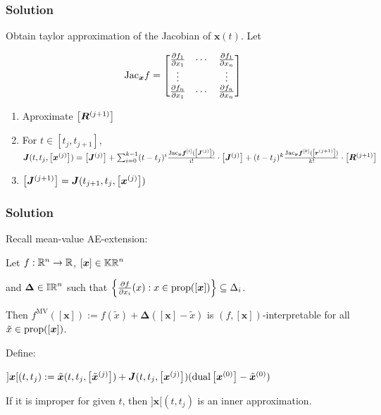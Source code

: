 \documentclass{beamer}
\newcommand{\fMV}{f^{\text{MV}}}
\begin{document}
\newcommand{\Jac}{\text{Jac}_{\bm{x}}}
\newcommand{\Enclosure}[1]{\arr{\bm{R}^{(#1)}}}
\newcommand{\Intervalbox}[1]{\arr{\bm{J}^{(#1)}}}

\begin{frame}
    \frametitle{Solution}

    Obtain taylor approximation of the Jacobian of $\bm{x}(t)$. Let \par
    \[\Jac f = \bmat
    \frac{\partial f_1}{\partial x_1} & \cdots & \frac{\partial f_1}{\partial x_n} \\
    \vdots & & \vdots \\
    \frac{\partial f_n}{\partial x_1} & \cdots & \frac{\partial f_n}{\partial x_n}
    \emat\]

    \vspace{7mm}
    \begin{enumerate}
        \item Aproximate $\Enclosure{j+1}$

        \vspace{2mm}
    \item For $t \in [t_j, t_{j+1}]$, $\bm{J}(t, t_j, \intervalbox{j}) = \Intervalbox{j} + \sum^{k-1}_{i=0} (t - t_j)^i \frac{\Jac\autof{i}(\Intervalbox{j})}{i!} \cdot \Intervalbox{j} + (t - t_j)^k \frac{\Jac\autof{k}(\enclosure{j+1})}{k!} \cdot \Enclosure{j+1}$

        \vspace{2mm}
        \item $\Intervalbox{j+1} = \bm{J}(t_{j+1}, t_j, \intervalbox{j})$
    \end{enumerate}
    
\end{frame}

\begin{frame}
    \frametitle{Solution}
    
    Recall mean-value AE-extension: \par
    Let $f: \mathbb R^n \rightarrow \mathbb R$, $[\bm{x}] \in \mathbb{KR}^n$ \par
    and $\bm{\Delta} \in \mathbb{IR}^n$ such that $\left\{\frac{\partial f}{\partial x_i}(x) : x \in \text{prop}([\bm{x}])\right\} \subseteq \Delta_i$. \par
    Then $\fMV([\bm{x}]) := f(\tilde{x}) + \bm{\Delta}([\bm{x}] - \tilde{x})$ is $(f, [\bm{x}])$-interpretable for all $\tilde{x} \in \text{prop}([\bm{x}])$.
 
    \vspace{7mm}
    Define: \par
    $]\bm{x}[(t, t_j) := \tilde{\bm{x}}(t, t_j, \left[\tilde{\bm{x}}^{(j)}\right]) + \bm{J}(t, t_j, \left[\bm{x}^{(j)}\right])(\text{dual}\left[\bm{x}^{(0)}\right] - \tilde{\bm{x}}^{(0)})$

    \vspace{2mm}
    If it is improper for given $t$, then $]\bm{x}[(t, t_j)$ is an inner approximation.
\end{frame}
\end{document}

